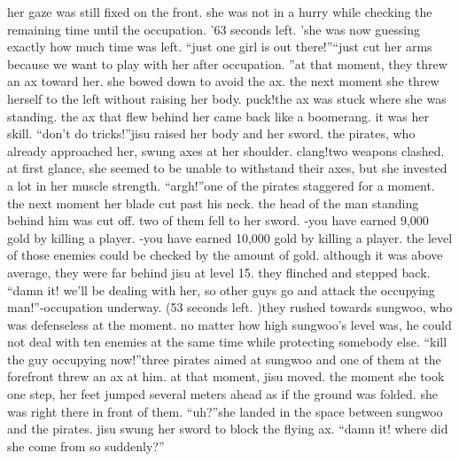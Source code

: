  her gaze was still fixed on the front.
 she was not in a hurry while checking the remaining time until the occupation.
’63 seconds left.
’she was now guessing exactly how much time was left.
“just one girl is out there!”“just cut her arms because we want to play with her after occupation.
”at that moment, they threw an ax toward her.
 she bowed down to avoid the ax.
the next moment she threw herself to the left without raising her body.
puck!the ax was stuck where she was standing.
 the ax that flew behind her came back like a boomerang.
 it was her skill.
“don’t do tricks!”jisu raised her body and her sword.
 the pirates, who already approached her, swung axes at her shoulder.
clang!two weapons clashed.
 at first glance, she seemed to be unable to withstand their axes, but she invested a lot in her muscle strength.
“argh!”one of the pirates staggered for a moment.
 the next moment her blade cut past his neck.
the head of the man standing behind him was cut off.
two of them fell to her sword.
-you have earned 9,000 gold by killing a player.
-you have earned 10,000 gold by killing a player.
the level of those enemies could be checked by the amount of gold.
 although it was above average, they were far behind jisu at level 15.
they flinched and stepped back.
“damn it! we’ll be dealing with her, so other guys go and attack the occupying man!”-occupation underway.
 (53 seconds left.
)they rushed towards sungwoo, who was defenseless at the moment.
 no matter how high sungwoo’s level was, he could not deal with ten enemies at the same time while protecting somebody else.
“kill the guy occupying now!”three pirates aimed at sungwoo and one of them at the forefront threw an ax at him.
at that moment, jisu moved.
 the moment she took one step, her feet jumped several meters ahead as if the ground was folded.
 she was right there in front of them.
“uh?”she landed in the space between sungwoo and the pirates.
jisu swung her sword to block the flying ax.
“damn it! where did she come from so suddenly?”

